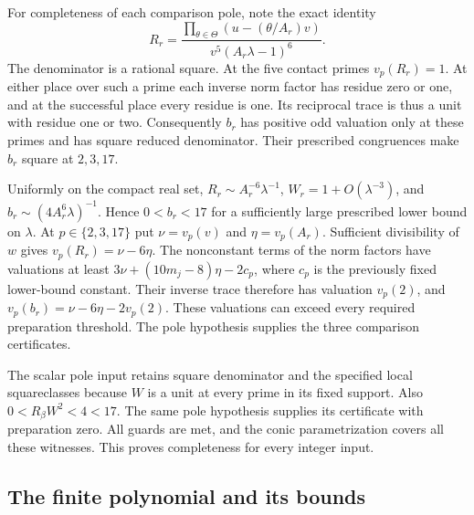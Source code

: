 \documentclass[11pt,a4paper]{article}
\theoremstyle{definition}
\theoremstyle{remark}
\begin{document}
For completeness of each comparison pole, note the exact identity
\[
 R_r=\frac{\prod_{\theta\in\Theta}(u-(\theta/A_r)v)}
                     {v^5(A_r\lambda-1)^6}.
\]
The denominator is a rational square.  At the five contact primes
$v_p(R_r)=1$.  At either place over such a prime each inverse norm
factor has residue zero or one, and at the successful place every
residue is one.  Its reciprocal trace is thus a unit with residue
one or two.  Consequently $b_r$ has positive odd valuation only at
these primes and has square reduced denominator.  Their prescribed
congruences make $b_r$ square at $2,3,17$.

Uniformly on the compact real set,
$R_r\sim A_r^{-6}\lambda^{-1}$,
$W_r=1+O(\lambda^{-3})$, and
$b_r\sim(4A_r^6\lambda)^{-1}$.
Hence $0<b_r<17$ for a sufficiently large prescribed lower bound on
$\lambda$.  At $p\in\{2,3,17\}$ put $\nu=v_p(v)$ and
$\eta=v_p(A_r)$.  Sufficient divisibility of $w$ gives
$v_p(R_r)=\nu-6\eta$.  The nonconstant terms of the norm factors
have valuations at least $3\nu+(10m_j-8)\eta-2c_p$, where $c_p$
is the previously fixed lower-bound constant.  Their inverse trace
therefore has valuation $v_p(2)$, and
$v_p(b_r)=\nu-6\eta-2v_p(2)$.  These valuations can exceed every
required preparation threshold.  The pole hypothesis supplies the
three comparison certificates.

The scalar pole input retains square denominator and the specified
local squareclasses because $W$ is a unit at every prime in its fixed
support.  Also $0<R_\beta W^2<4<17$.  The same pole hypothesis
supplies its certificate with preparation zero.  All guards are met,
and the conic parametrization covers all these witnesses.  This proves
completeness for every integer input.

\subsection{The finite polynomial and its bounds}
\end{document}
